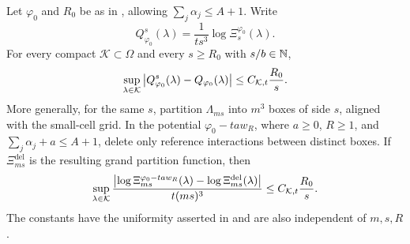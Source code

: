 \begin{lemma}
\label{k:box-pressure}
Let $\varphi_0$ and $R_0$ be as in , allowing
$\sum_j\alpha_j\le A+1$.  Write
\[
 Q^s_{\varphi_0}(\lambda)
 =\frac1{ts^3}\log\Xi_s^{\varphi_0}(\lambda).
\]
For every compact $\mathcal K\subset\Omega$ and every $s\ge R_0$ with
$s/b\in\mathbb N$,
\begin{equation}
 \sup_{\lambda\in\mathcal K}
 \left|Q^s_{\varphi_0}(\lambda)-Q_{\varphi_0}(\lambda)\right|
 \le C_{\mathcal K,t}\frac{R_0}{s}.
 \label{k:box-pressure-bound}
\end{equation}
More generally, for the same $s$, partition $\Lambda_{ms}$ into $m^3$
boxes of side $s$, aligned with the small-cell grid.  In the potential
$\varphi_0-ta w_R$, where $a\ge0$, $R\ge1$, and
$\sum_j\alpha_j+a\le A+1$, delete only reference interactions between
distinct boxes.  If $\Xi^{\mathrm{del}}_{ms}$ is the resulting grand
partition function, then
\begin{equation}
 \sup_{\lambda\in\mathcal K}
 \frac{\left|\log\Xi_{ms}^{\varphi_0-ta w_R}(\lambda)
                 -\log\Xi^{\mathrm{del}}_{ms}(\lambda)\right|}{t(ms)^3}
 \le C_{\mathcal K,t}\frac{R_0}{s}.
 \label{k:deletion}
\end{equation}
The constants have the uniformity asserted in  and are
also independent of $m,s,R$.
\end{lemma}

